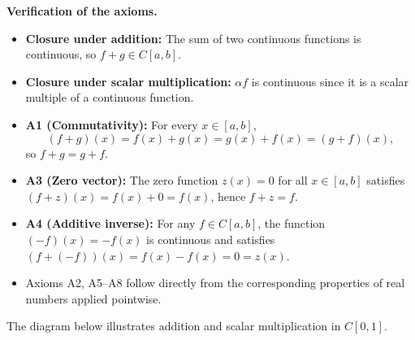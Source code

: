 \documentclass[12pt]{article}
\begin{document}
	\noindent
	\textbf{Verification of the axioms.}
	
	\begin{itemize}[leftmargin=2em, itemsep=0.4em]
		\item \textbf{Closure under addition:} The sum of two continuous functions is
		continuous, so $f+g \in C[a,b]$.
		\item \textbf{Closure under scalar multiplication:} $\alpha f$ is continuous
		since it is a scalar multiple of a continuous function.
		\item \textbf{A1 (Commutativity):} For every $x\in[a,b]$,
		\[
		(f+g)(x) = f(x)+g(x) = g(x)+f(x) = (g+f)(x),
		\]
		so $f+g = g+f$.
		\item \textbf{A3 (Zero vector):} The zero function $z(x)=0$ for all
		$x\in[a,b]$ satisfies $(f+z)(x) = f(x)+0 = f(x)$, hence $f+z=f$.
		\item \textbf{A4 (Additive inverse):} For any $f\in C[a,b]$, the function
		$(-f)(x) = -f(x)$ is continuous and satisfies
		$(f + (-f))(x) = f(x) - f(x) = 0 = z(x)$.
		\item Axioms A2, A5--A8 follow directly from the corresponding properties
		of real numbers applied pointwise.
	\end{itemize}
	
	\noindent
	The diagram below illustrates addition and scalar multiplication in $C[0,1]$.
	
\end{document}
